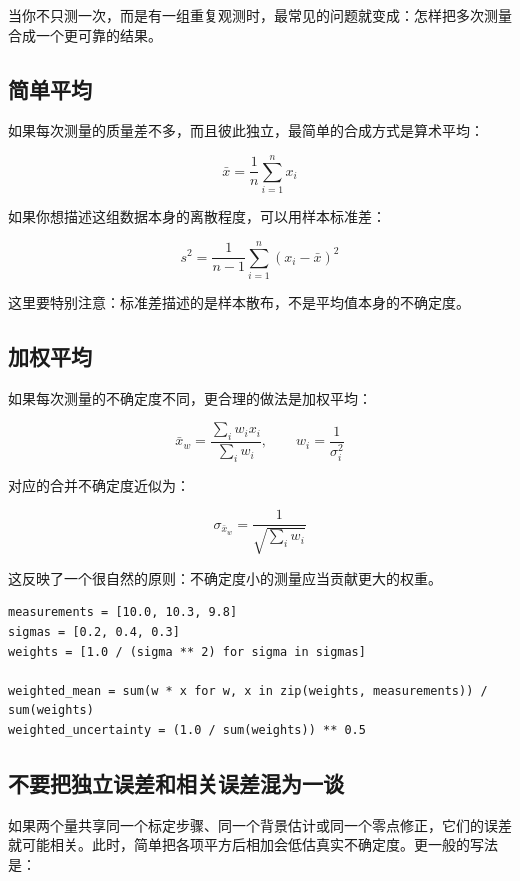 当你不只测一次，而是有一组重复观测时，最常见的问题就变成：怎样把多次测量合成一个更可靠的结果。

\subsection{简单平均}

如果每次测量的质量差不多，而且彼此独立，最简单的合成方式是算术平均：

\[
\bar{x} = \frac{1}{n}\sum_{i=1}^{n} x_i
\]

如果你想描述这组数据本身的离散程度，可以用样本标准差：

\[
s^2 = \frac{1}{n-1}\sum_{i=1}^{n}(x_i - \bar{x})^2
\]

这里要特别注意：标准差描述的是样本散布，不是平均值本身的不确定度。

\subsection{加权平均}

如果每次测量的不确定度不同，更合理的做法是加权平均：

\[
\bar{x}_w = \frac{\sum_i w_i x_i}{\sum_i w_i}, \qquad w_i = \frac{1}{\sigma_i^2}
\]

对应的合并不确定度近似为：

\[
\sigma_{\bar{x}_w} = \frac{1}{\sqrt{\sum_i w_i}}
\]

这反映了一个很自然的原则：不确定度小的测量应当贡献更大的权重。

\begin{examplebox}[加权平均的最小实现]
\begin{lstlisting}[style=pythonstyle]
measurements = [10.0, 10.3, 9.8]
sigmas = [0.2, 0.4, 0.3]
weights = [1.0 / (sigma ** 2) for sigma in sigmas]

weighted_mean = sum(w * x for w, x in zip(weights, measurements)) / sum(weights)
weighted_uncertainty = (1.0 / sum(weights)) ** 0.5
\end{lstlisting}
\end{examplebox}

\subsection{不要把独立误差和相关误差混为一谈}

如果两个量共享同一个标定步骤、同一个背景估计或同一个零点修正，它们的误差就可能相关。此时，简单把各项平方后相加会低估真实不确定度。更一般的写法是：

